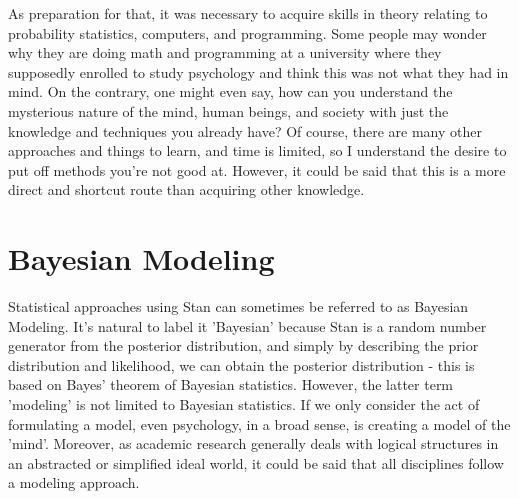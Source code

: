 \documentclass{ltjsbook}
\begin{document}
As preparation for that, it was necessary to acquire skills in theory relating to probability statistics, computers, and programming. Some people may wonder why they are doing math and programming at a university where they supposedly enrolled to study psychology and think this was not what they had in mind. On the contrary, one might even say, how can you understand the mysterious nature of the mind, human beings, and society with just the knowledge and techniques you already have? Of course, there are many other approaches and things to learn, and time is limited, so I understand the desire to put off methods you're not good at. However, it could be said that this is a more direct and shortcut route than acquiring other knowledge.

\section{Bayesian Modeling}
Statistical approaches using Stan can sometimes be referred to as Bayesian Modeling. It's natural to label it 'Bayesian' because Stan is a random number generator from the posterior distribution, and simply by describing the prior distribution and likelihood, we can obtain the posterior distribution - this is based on Bayes' theorem of Bayesian statistics. However, the latter term 'modeling' is not limited to Bayesian statistics. If we only consider the act of formulating a model, even psychology, in a broad sense, is creating a model of the 'mind'. Moreover, as academic research generally deals with logical structures in an abstracted or simplified ideal world, it could be said that all disciplines follow a modeling approach.
\end{document}
